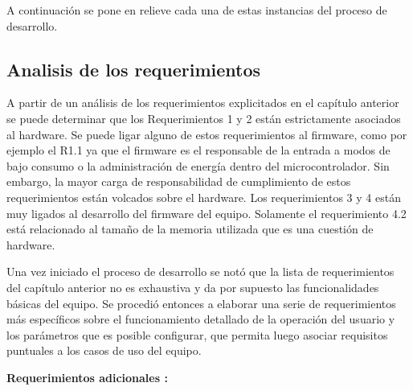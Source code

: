 A continuación se pone en relieve cada una de estas instancias del proceso de desarrollo.

\subsection{Analisis de los requerimientos}

A partir de un análisis de los requerimientos explicitados en el capítulo anterior se puede determinar que los Requerimientos 1 y 2 están estrictamente asociados al hardware. Se puede ligar alguno de estos requerimientos al firmware, como por ejemplo el R1.1 ya que el firmware es el responsable de la entrada a modos de bajo consumo o la administración de energía dentro del microcontrolador. Sin embargo, la mayor carga de responsabilidad de cumplimiento de estos requerimientos están volcados sobre el hardware. Los requerimientos 3 y 4 están muy ligados al desarrollo del firmware del equipo. Solamente el requerimiento 4.2 está relacionado al tamaño de la memoria utilizada que es una cuestión de hardware.

Una vez iniciado el proceso de desarrollo se notó que la lista de requerimientos del capítulo anterior no es exhaustiva y da por supuesto las funcionalidades básicas del equipo. Se procedió entonces a elaborar una serie de requerimientos más específicos sobre el funcionamiento detallado de la operación del usuario y los parámetros que es posible configurar, que permita luego asociar requisitos puntuales a los casos de uso del equipo. 

\textbf{Requerimientos adicionales :}


